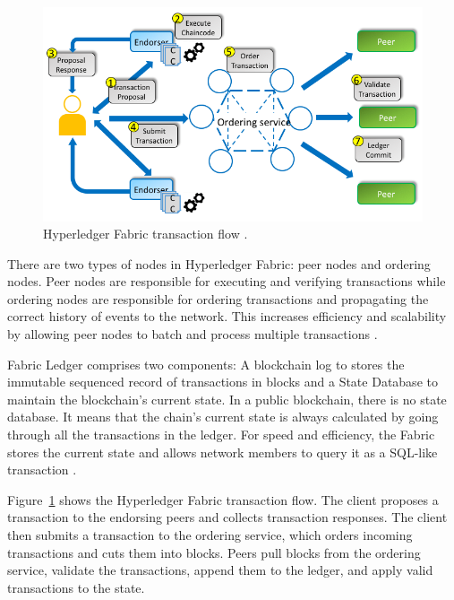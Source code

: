 \begin{figure}[htbp]
\begin{center}
  \includegraphics[scale=0.43]{images/Hyperledger-Fabric-high-level-transaction-flow.png}
\caption{Hyperledger Fabric  transaction flow \cite{manevich2018service}.}
\label{fig:hyperledgerFlow}
\end{center}
\end{figure}

There are two types of nodes in Hyperledger Fabric: peer nodes and ordering nodes. Peer nodes are responsible for executing and verifying transactions while ordering nodes are responsible for ordering transactions and propagating the correct history of events to the network. This increases efficiency and scalability by allowing peer nodes to batch and process multiple transactions \cite{buterin2016smart}. 

Fabric Ledger comprises two components: A blockchain log to stores the immutable sequenced record of transactions in blocks and a State Database to maintain the blockchain's current state. In a public blockchain, there is no state database. It means that the chain's current state is always calculated by going through all the transactions in the ledger. For speed and efficiency, the Fabric stores the current state and allows network members to query it as a SQL-like transaction \cite{blockgeeks2016blockchain}. 

Figure~\ref{fig:hyperledgerFlow} shows the Hyperledger Fabric transaction flow. The client proposes a transaction to the endorsing peers  and collects transaction responses. The client then submits a transaction to the ordering service, which orders incoming transactions and cuts them into blocks. Peers pull blocks from the ordering service, validate the transactions, append them to the ledger, and apply valid transactions to the state.

